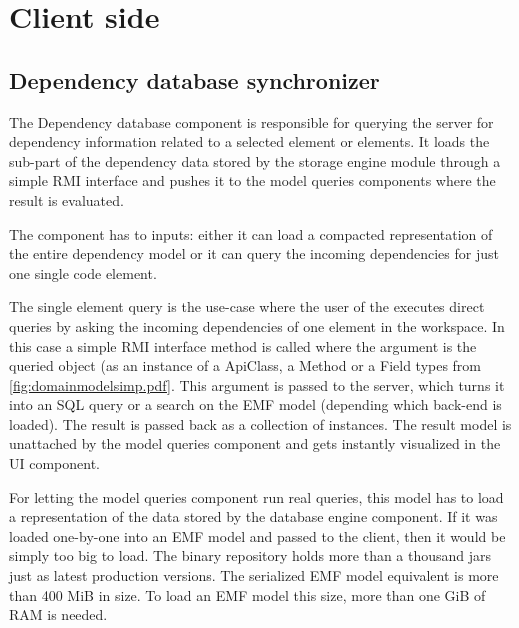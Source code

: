 \section{Client side}


\subsection{Dependency database synchronizer}
\label{sect:depdbsynch}


The Dependency database component is responsible for querying the server for
dependency information related to a selected element or elements. It loads the
sub-part of the dependency data stored by the storage engine module through a
simple RMI interface and pushes it to the model queries components where the
result is evaluated.

The component has to inputs: either it can load a compacted representation of the 
entire dependency model or it can query the incoming dependencies for just one 
single code element. 

The single element query is the use-case where the user of the \ptool  executes
direct queries by asking the incoming dependencies of one element in
the workspace. In this case a simple RMI interface method is called where the
argument is the queried object (as an instance of a ApiClass, a Method or a
Field types from \autoref{fig:domainmodelsimp.pdf}. This argument is passed to
the server, which turns it into an SQL query or a search on the EMF model
(depending which back-end is loaded). The result is passed back as a collection
of  instances. The result model is unattached by the model
queries component and gets instantly visualized in the UI component.

For letting the model queries component run real queries, this model has to load
a representation of the data stored by the database engine component. If it was
loaded one-by-one into an EMF model and passed to the client, then it would be
simply too big to load. The binary repository holds more than a thousand jars
just as latest production versions. The serialized EMF model equivalent is more
than 400 MiB in size. To load an EMF model this size, more than one GiB  of
RAM is needed.

